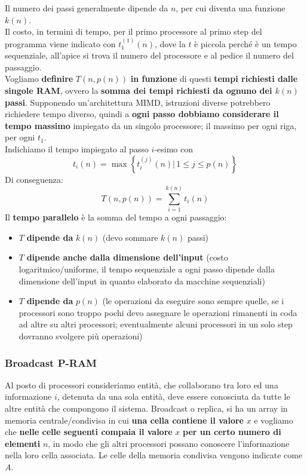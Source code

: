 \documentclass[11pt]{article}
\begin{document}
	Il numero dei passi generalmente dipende da $n$, per cui diventa una funzione $k(n)$.\\
	
	Il costo, in termini di tempo, per il primo processore al primo step del programma viene indicato con $t_1^{(1)} (n)$, dove la $t$ è piccola perché è un tempo sequenziale, all'apice si trova il numero del processore e al pedice il numero del passaggio.\\
	
	Vogliamo \textbf{definire} $T(n, p(n))$ \textbf{in funzione} di questi \textbf{tempi richiesti dalle singole RAM}, ovvero la \textbf{somma dei tempi richiesti da ognuno dei $k(n)$ passi}. Supponendo un'architettura MIMD, istruzioni diverse potrebbero richiedere tempo diverso, quindi a \textbf{ogni passo dobbiamo considerare il tempo massimo} impiegato da un singolo processore; il massimo per ogni riga, per ogni $t_1$.\\
	Indichiamo il tempo impiegato al passo $i$-esimo con
	$$ t_i (n) = \max \left\{ t_i^{(j)} (n) | \, 1 \leq j \leq p(n) \right\}$$
	Di conseguenza: 
	$$ T\left(n, p(n)\right) = \sum_{i = 1}^{k(n)} t_i (n) $$
	Il \textbf{tempo parallelo} è la somma del tempo a ogni passaggio:
	\begin{itemize}
		\item $T$ \textbf{dipende da} $k(n)$ (devo sommare $k(n)$ passi)
		\item $T$ \textbf{dipende anche dalla dimensione dell'input} (costo logaritmico/uniforme, il tempo sequenziale a ogni passo dipende dalla dimensione dell'input in quanto elaborato da macchine sequenziali)
		\item $T$ \textbf{dipende da} $p(n)$ (le operazioni da eseguire sono sempre quelle, se i processori sono troppo pochi devo assegnare le operazioni rimanenti in coda ad altre su altri processori; eventualmente alcuni processori in un solo step dovranno svolgere più operazioni)
	\end{itemize}
	
	\newpage
	
	\subsubsection{Broadcast P-RAM}
	
	Al posto di processori consideriamo entità, che collaborano tra loro ed una informazione $i$, detenuta da una sola entità, deve essere conosciuta da tutte le altre entità che compongono il sistema. Broadcast o replica, si ha un array in memoria centrale/condivisa in cui \textbf{una cella contiene il valore} $x$ e vogliamo che \textbf{nelle celle seguenti compaia il valore} $x$ \textbf{per un certo numero di elementi} $n$, in modo che gli altri processori possano conoscere l'informazione nella loro cella associata. Le celle della memoria condivisa vengono indicate come $A$. 
	
\end{document}
